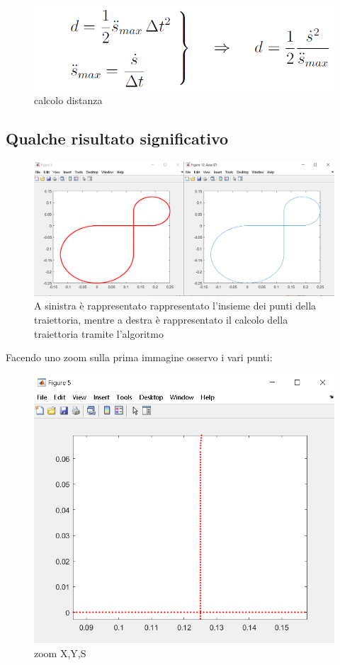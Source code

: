 \documentclass{article}
\begin{document}
\begin{figure}[H]
\centering
\includegraphics[width=.5\textwidth]{./strategia/strategia.png}
\caption{ calcolo distanza}
\end{figure}




\subsection{Qualche risultato significativo}


\begin{figure}[H]
\centering
\includegraphics[width=.9\textwidth]{./strategia/confronto.png}
\caption{ A sinistra è rappresentato rappresentato l'insieme dei punti della traiettoria, mentre a destra è rappresentato il calcolo della traiettoria tramite l'algoritmo }
\end{figure}
Facendo uno zoom sulla prima immagine osservo i vari punti: 

\begin{figure}[H]
\centering
\includegraphics[width=.6\textwidth]{./strategia/zoomcon.png}
\caption{ zoom X,Y,S}
\end{figure}
\end{document}
